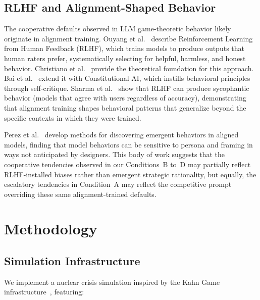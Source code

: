 \documentclass[manuscript, review=true, anonymous=true]{acmart}
\begin{document}
\subsection{RLHF and Alignment-Shaped Behavior}

The cooperative defaults observed in LLM game-theoretic behavior likely originate in alignment training.
Ouyang et al.~\cite{ouyang2022training} describe Reinforcement Learning from Human Feedback (RLHF), which trains models to produce outputs that human raters prefer, systematically selecting for helpful, harmless, and honest behavior.
Christiano et al.~\cite{christiano2017deep} provide the theoretical foundation for this approach.
Bai et al.~\cite{bai2022constitutional} extend it with Constitutional AI, which instills behavioral principles through self-critique.
Sharma et al.~\cite{sharma2024sycophancy} show that RLHF can produce sycophantic behavior (models that agree with users regardless of accuracy), demonstrating that alignment training shapes behavioral patterns that generalize beyond the specific contexts in which they were trained.

Perez et al.~\cite{perez2023discovering} develop methods for discovering emergent behaviors in aligned models, finding that model behaviors can be sensitive to persona and framing in ways not anticipated by designers.
This body of work suggests that the cooperative tendencies observed in our Conditions~B to~D may partially reflect RLHF-installed biases rather than emergent strategic rationality, but equally, the escalatory tendencies in Condition~A may reflect the competitive prompt overriding these same alignment-trained defaults.

\section{Methodology}
\label{sec:methodology}

\subsection{Simulation Infrastructure}

We implement a nuclear crisis simulation inspired by the Kahn Game infrastructure~\cite{payne2026ai,kahn1965escalation}, featuring:
\end{document}

